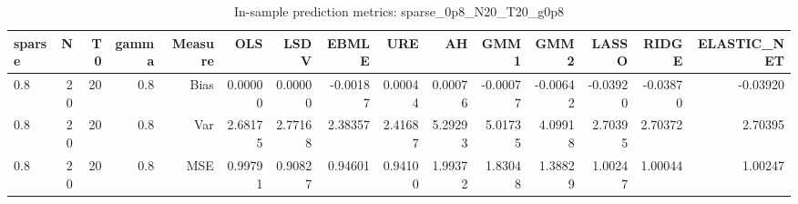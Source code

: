 \begin{table}[!htbp]\centering
\caption{In-sample prediction metrics: sparse_0p8_N20_T20_g0p8}
\label{tab:table2_sparse_0p8_N20_T20_g0p8}
\begin{tabular}{lrrrrrrrrrrrrrr}
\hline
sparse & N & T0 & gamma & Measure & OLS & LSDV & EBMLE & URE & AH & GMM1 & GMM2 & LASSO & RIDGE & ELASTIC_NET \\
\hline
0.8 & 20 & 20 & 0.8 & Bias & 0.00000 & 0.00000 & -0.00187 & 0.00044 & 0.00076 & -0.00077 & -0.00642 & -0.03920 & -0.03870 & -0.03920 \\
0.8 & 20 & 20 & 0.8 & Var & 2.68175 & 2.77168 & 2.38357 & 2.41687 & 5.29293 & 5.01735 & 4.09918 & 2.70395 & 2.70372 & 2.70395 \\
0.8 & 20 & 20 & 0.8 & MSE & 0.99791 & 0.90827 & 0.94601 & 0.94100 & 1.99372 & 1.83048 & 1.38829 & 1.00247 & 1.00044 & 1.00247 \\
\hline
\end{tabular}
\end{table}

